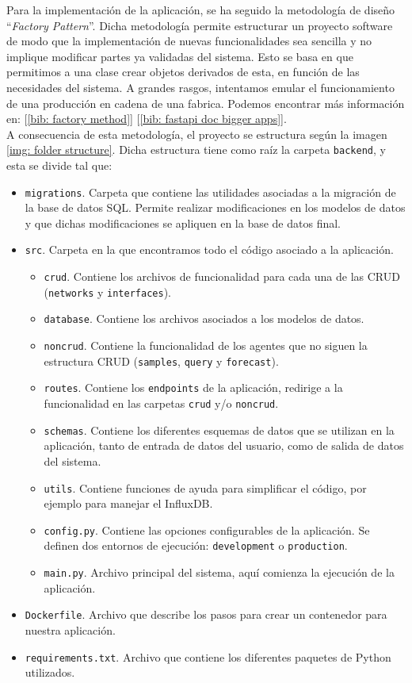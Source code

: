 \documentclass[a4paper, oneside, 12pt]{book}
\begin{document}
	\noindent Para la implementación de la aplicación, se ha seguido la metodología de diseño ``\textit{Factory Pattern}''. Dicha metodología permite estructurar un proyecto software de modo que la implementación de nuevas funcionalidades sea sencilla y no implique modificar partes ya validadas del sistema. Esto se basa en que permitimos a una clase crear objetos derivados de esta, en función de las necesidades del sistema. A grandes rasgos, intentamos emular el funcionamiento de una producción en cadena de una fabrica. Podemos encontrar más información en: [\ref{bib: factory method}] [\ref{bib: fastapi doc bigger apps}]. \\
	
	\noindent A consecuencia de esta metodología, el proyecto se estructura según la imagen \ref{img: folder structure}. Dicha estructura tiene como raíz la carpeta \texttt{backend}, y esta se divide tal que:
	
	\begin{itemize}
		\item \texttt{migrations}. Carpeta que contiene las utilidades asociadas a la migración de la base de datos SQL. Permite realizar modificaciones en los modelos de datos y que dichas modificaciones se apliquen en la base de datos final.
		\item \texttt{src}. Carpeta en la que encontramos todo el código asociado a la aplicación.
			\begin{itemize}
				\item \texttt{crud}. Contiene los archivos de funcionalidad para cada una de las CRUD (\texttt{networks} y \texttt{interfaces}).
				\item \texttt{database}. Contiene los archivos asociados a los modelos de datos.
				\item \texttt{noncrud}. Contiene la funcionalidad de los agentes que no siguen la estructura CRUD (\texttt{samples}, \texttt{query} y \texttt{forecast}).
				\item \texttt{routes}. Contiene los \texttt{endpoints} de la aplicación, redirige a la funcionalidad en las carpetas \texttt{crud} y/o \texttt{noncrud}.
				\item \texttt{schemas}. Contiene los diferentes esquemas de datos que se utilizan en la aplicación, tanto de entrada de datos del usuario, como de salida de datos del sistema.
				\item \texttt{utils}. Contiene funciones de ayuda para simplificar el código, por ejemplo para manejar el InfluxDB.
				\item \texttt{config.py}. Contiene las opciones configurables de la aplicación. Se definen dos entornos de ejecución: \texttt{development} o \texttt{production}.
				\item \texttt{main.py}. Archivo principal del sistema, aquí comienza la ejecución de la aplicación.
			\end{itemize}
		
		\item \texttt{Dockerfile}. Archivo que describe los pasos para crear un contenedor para nuestra aplicación.
		\item \texttt{requirements.txt}. Archivo que contiene los diferentes paquetes de Python utilizados.
	\end{itemize}
	
\end{document}
